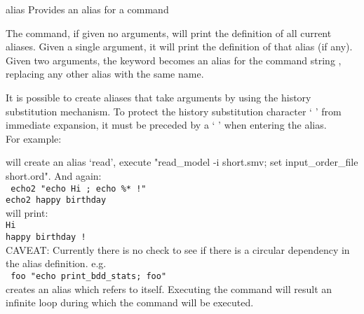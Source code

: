 \begin{nusmvCommand} {alias} {Provides an alias for a command}


The  command, if given no arguments, will print the definition
of all current aliases.  Given a single argument, it will print the
definition of that alias (if any).  Given two arguments, the keyword
 becomes an alias for the command string
, replacing any other alias with the same name.\\
\begin{cmdOpt}
\end{cmdOpt}

It is possible to create aliases that take arguments by using the
history substitution mechanism. To protect the history substitution
character ` \code{\%}' from immediate expansion, it must be preceded
by a ` \code{$\backslash$}' when entering the alias. \\

For example:

\noindent
{}
  will create an alias `read', execute "read\_model -i short.smv; 
    set input\_order\_file short.ord".
  And again:\\
   \texttt{\nusmvprompt {} echo2 "echo Hi ; echo \%* !"\\ 
  \nusmvprompt echo2 happy birthday\\
  }
  will print:\\
   \texttt{Hi\\
  happy birthday !
  }\\
  CAVEAT: Currently there is no check to see if there is a circular
  dependency in the alias definition. e.g.\\
   \texttt{\nusmvprompt {} foo "echo print\_bdd\_stats; foo"
  }\\
  creates an alias which refers to itself. Executing the command   
  will result an infinite loop during which the command 
    will be executed.

\end{nusmvCommand}
